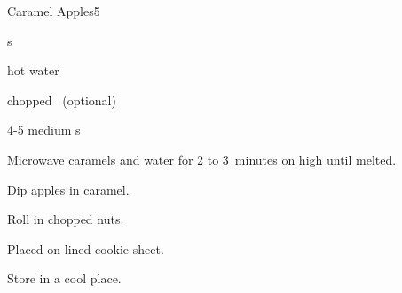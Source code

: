 \begin{recipe}{Caramel Apples}{}{5}

\begin{ingredients}
\item {} s
\item {} hot water
\item chopped ~(optional)
\item 4-5 medium s
\end{ingredients}

\begin{directions}
\item Microwave caramels and water for 2 to 3~minutes on high until melted.
\item Dip apples in caramel.
\item Roll in chopped nuts.
\item Placed on lined cookie sheet.
\item Store in a cool place.
\end{directions}

\end{recipe}
